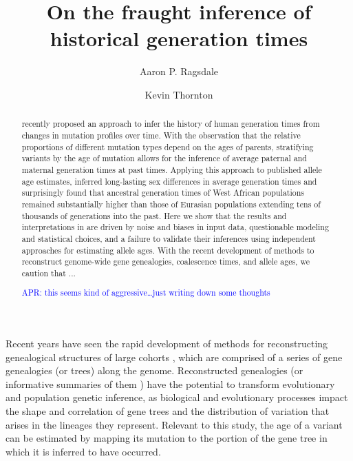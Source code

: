\documentclass[]{article}
\newcommand{\aprcomment}[1]{{\textcolor{blue}{APR: #1}}}
\begin{document}
\title{On the fraught inference of historical generation times}
\author[1,*]{Aaron P. Ragsdale}
\author[2]{Kevin Thornton}
\maketitle

\begin{abstract}

    \noindent \citet{wang2023human} recently proposed an approach to infer the
    history of human generation times from changes in mutation profiles over
    time. With the observation that the relative proportions of different
    mutation types depend on the ages of parents, stratifying variants by the
    age of mutation allows for the inference of average paternal and maternal
    generation times at past times. Applying this approach to published allele
    age estimates, \citeauthor{wang2023human} inferred long-lasting sex
    differences in average generation times and surprisingly found that
    ancestral generation times of West African populations remained
    substantially higher than those of Eurasian populations extending tens of
    thousands of generations into the past. Here we show that the results and
    interpretations in \citet{wang2023human} are driven by noise and biases in
    input data, questionable modeling and statistical choices, and a failure to
    validate their inferences using independent approaches for estimating
    allele ages. With the recent development of methods to reconstruct
    genome-wide gene genealogies, coalescence times, and allele ages, we
    caution that ...

    \aprcomment{this seems kind of aggressive\ldots just writing down some thoughts}

\end{abstract}

Recent years have seen the rapid development of methods for reconstructing
genealogical structures of large cohorts
\citep{speidel2019method,wohns2022unified,hubisz2020mapping}, which are
comprised of a series of gene genealogies (or trees) along the genome.
Reconstructed genealogies (or informative summaries of them
\citep{albers2020dating}) have the potential to transform evolutionary and
population genetic inference, as biological and evolutionary processes impact
the shape and correlation of gene trees and the distribution of variation that
arises in the lineages they represent. Relevant to this study, the age of a
variant can be estimated by mapping its mutation to the portion of the gene
tree in which it is inferred to have occurred.
\end{document}
